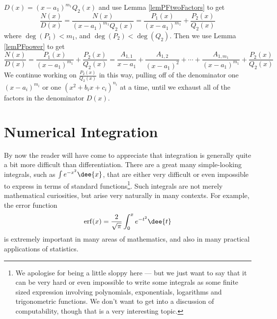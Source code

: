 $D(x)= (x-a_1)^{m_1} Q_2(x)$
and use Lemma \ref{lemPFtwoFactors} to get
\begin{equation*}
\frac{N(x)}{D(x)}
=\frac{N(x)}{(x-a_1)^{m_1} Q_2(x)}=\frac{P_1(x)}{(x-a_1)^{m_1}}
   + \frac{P_2(x)}{Q_2(x)}
\end{equation*}
where $\deg(P_1)<m_1$, and $\deg(P_2)<\deg(Q_2)$. Then we use 
Lemma \ref{lemPFpower} to get
\begin{equation*}
\frac{N(x)}{D(x)}
=\frac{P_1(x)}{(x-a_1)^{m_1}}   + \frac{P_2(x)}{Q_2(x)}
=\frac{A_{1,1}}{x-a_1}+\frac{A_{1,2}}{(x-a_1)^2}+\cdots
          +\frac{A_{1,m_1}}{(x-a_1)^{m_1}}
   + \frac{P_2(x)}{Q_2(x)}
\end{equation*}
We continue working on $\frac{P_2(x)}{Q_2(x)}$ in this way, 
pulling off of the denominator one $(x-a_i)^{m_i}$ or one 
$(x^2+b_ix + c_i)^{n_i}$ at a time,
until we exhaust all of the factors in the denominator $D(x)$.







\section{Numerical Integration}\label{sec numeric int}
By now the reader will have come to appreciate that integration is generally quite a bit
more difficult than differentiation. There are a great many simple-looking integrals,
such as $\int e^{-x^2}\dee{x}$, that are either very difficult or even impossible to
express in terms of standard functions\footnote{We apologise for being a little sloppy
here --- but we just want to say that it can be very hard or even impossible to write some
integrals as some finite sized expression involving polynomials, exponentials, logarithms
and trigonometric functions. We don't want to get into a discussion of computability,
though that is a very interesting topic.}. Such integrals are not merely mathematical
curiosities, but arise very naturally in many contexts. For example, the error function
\begin{align*}
 \mathrm{erf}(x) = \frac{2}{\sqrt{\pi}}\int_0^x e^{-t^2}\dee{t}
\end{align*}
is extremely important in many areas of mathematics, and also in many practical
applications of statistics.

